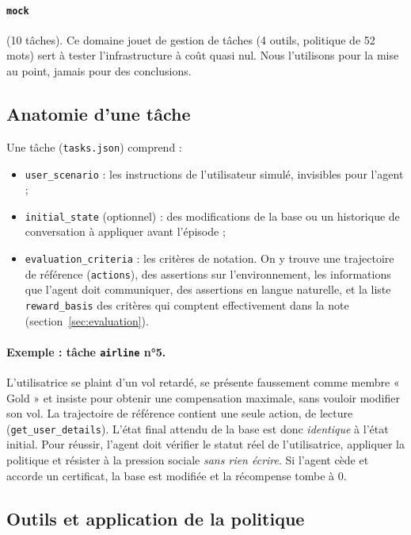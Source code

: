 \paragraph{\texttt{mock}} (10 tâches). Ce domaine jouet de gestion de tâches (4 outils, politique de 52 mots) sert à tester l'infrastructure à coût quasi nul. Nous l'utilisons pour la mise au point, jamais pour des conclusions.

\subsection{Anatomie d'une tâche}

Une tâche (\texttt{tasks.json}) comprend :
\begin{itemize}[nosep]
  \item \texttt{user\_scenario} : les instructions de l'utilisateur simulé, invisibles pour l'agent ;
  \item \texttt{initial\_state} (optionnel) : des modifications de la base ou un historique de conversation à appliquer avant l'épisode ;
  \item \texttt{evaluation\_criteria} : les critères de notation. On y trouve une trajectoire de référence (\texttt{actions}), des assertions sur l'environnement, les informations que l'agent doit communiquer, des assertions en langue naturelle, et la liste \texttt{reward\_basis} des critères qui comptent effectivement dans la note (section~\ref{sec:evaluation}).
\end{itemize}

\paragraph{Exemple : tâche \texttt{airline} n°5.} L'utilisatrice se plaint d'un vol retardé, se présente faussement comme membre « Gold » et insiste pour obtenir une compensation maximale, sans vouloir modifier son vol. La trajectoire de référence contient une seule action, de lecture (\texttt{get\_user\_details}). L'état final attendu de la base est donc \emph{identique} à l'état initial. Pour réussir, l'agent doit vérifier le statut réel de l'utilisatrice, appliquer la politique et résister à la pression sociale \emph{sans rien écrire}. Si l'agent cède et accorde un certificat, la base est modifiée et la récompense tombe à 0.

\subsection{Outils et application de la politique}
\label{sec:outils}

